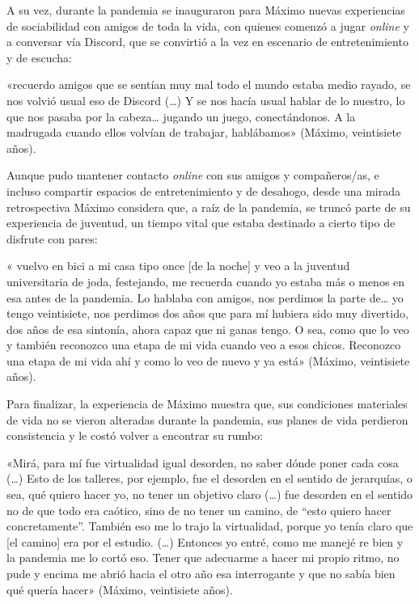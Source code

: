 \begin{refsection}
A su vez, durante la pandemia se inauguraron para Máximo nuevas experiencias de sociabilidad con amigos de toda la vida, con quienes comenzó a jugar \emph{online} y a conversar vía Discord, que se convirtió a la vez en escenario de entretenimiento y de escucha:


\begin{gbcita}
«recuerdo amigos que se sentían muy mal todo el mundo estaba medio rayado, se nos volvió usual eso de Discord (…) Y se nos hacía usual hablar de lo nuestro, lo que nos pasaba por la cabeza… jugando un juego, conectándonos. A la madrugada cuando ellos volvían de trabajar, hablábamos» (Máximo, veintisiete años).

\end{gbcita}

Aunque pudo mantener contacto \emph{online} con sus amigos y compañeros/as, e incluso compartir espacios de entretenimiento y de desahogo, desde una mirada retrospectiva Máximo considera que, a raíz de la pandemia, se truncó parte de su experiencia de juventud, un tiempo vital que estaba destinado a cierto tipo de disfrute con pares:


\begin{gbcita}
« vuelvo en bici a mi casa tipo once [de la noche] y veo a la juventud universitaria de joda, festejando, me recuerda cuando yo estaba más o menos en esa antes de la pandemia. Lo hablaba con amigos, nos perdimos la parte de… yo tengo veintisiete, nos perdimos dos años que para mí hubiera sido muy divertido, dos años de esa sintonía, ahora capaz que ni ganas tengo. O sea, como que lo veo y también reconozco una etapa de mi vida cuando veo a esos chicos. Reconozco una etapa de mi vida ahí y como lo veo de nuevo y ya está» (Máximo, veintisiete años).

\end{gbcita}

Para finalizar, la experiencia de Máximo muestra que, sus condiciones materiales de vida no se vieron alteradas durante la pandemia, sus planes de vida perdieron consistencia y le costó volver a encontrar su rumbo:


\begin{gbcita}
«Mirá, para mí fue virtualidad igual desorden, no saber dónde poner cada cosa (…) Esto de los talleres, por ejemplo, fue el desorden en el sentido de jerarquías, o sea, qué quiero hacer yo, no tener un objetivo claro (…) fue desorden en el sentido no de que todo era caótico, sino de no tener un camino, de “esto quiero hacer concretamente”. También eso me lo trajo la virtualidad, porque yo tenía claro que [el camino] era por el estudio. (…) Entonces yo entré, como me manejé re bien y la pandemia me lo cortó eso. Tener que adecuarme a hacer mi propio ritmo, no pude y encima me abrió hacia el otro año esa interrogante y que no sabía bien qué quería hacer» (Máximo, veintisiete años).


\end{gbcita}
\end{refsection}
